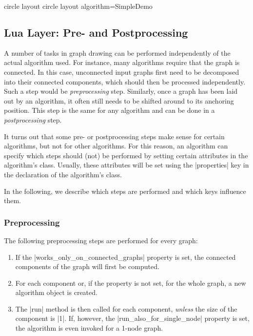 \begin{codeexample}
  
\pgfgddeclarealgorithmkey
  {circle layout}
  {circle layout}
  {algorithm=SimpleDemo}

\end{codeexample}




\subsection{Lua Layer: Pre- and Postprocessing}

A number of tasks in graph drawing can be performed independently of
the actual algorithm used. For instance, many algorithms require that
the graph is connected. In this case, unconnected input graphs first
need to be decomposed into their connected components, which should
then be processed independently. Such a step would be
\emph{preprocessing} step. Similarly, once a graph has been laid out
by an algorithm, it often still needs to be shifted around to its
anchoring position. This step is the same for any algorithm and can be
done in a \emph{postprocessing} step.

It turns out that some pre- or postprocessing steps make sense for
certain algorithms, but not for other algorithms. For this reason, an
algorithm can specify which steps should (not) be performed by setting
certain attributes in the algorithm's class. Usually, these attributes
will be set using the |properties| key in the declaration of the
algorithm's class.

In the following, we describe which steps are performed and which keys
influence them.


\subsubsection{Preprocessing}

The following preprocessing steps are performed for every graph:
\begin{enumerate}
\item If the |works_only_on_connected_graphs| property is set, the
  connected components of the graph will first be computed.
\item For each component or, if the property is not set, for the whole
  graph, a new algorithm object is created.
\item The |run| method is then called for each component,
  \emph{unless} the size of the component is |1|. If, however, the
  |run_also_for_single_node| property is set, the algorithm is even
  invoked for a 1-node graph.
\end{enumerate}

